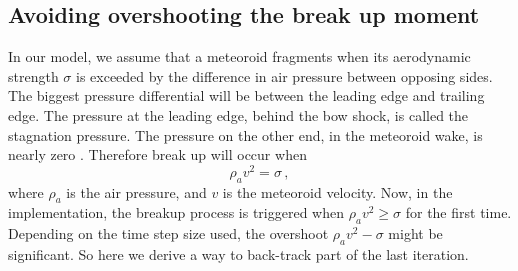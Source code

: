 \subsection{Avoiding overshooting the break up moment}

In our model, we assume that a meteoroid fragments when its aerodynamic strength $\sigma$ is exceeded by the difference in air pressure between opposing sides. The biggest pressure differential will be between the leading edge and trailing edge. The pressure at the leading edge, behind the bow shock, is called the stagnation pressure. The pressure on the other end, in the meteoroid wake, is nearly zero \citep{passey1980effects}. Therefore break up will occur when
\begin{equation}
    \rho_a v^2 = \sigma\,,
\end{equation}
where $\rho_a$ is the air pressure, and $v$ is the meteoroid velocity. Now, in the implementation, the breakup process is triggered when $\rho_a v^2 \geq \sigma$ for the first time. Depending on the time step size used, the overshoot $\rho_a v^2 - \sigma$ might be significant. So here we derive a way to back-track part of the last iteration.


